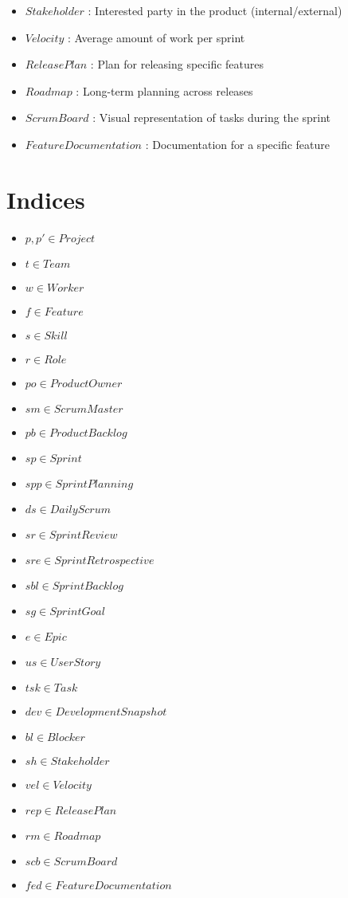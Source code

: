 \documentclass[11pt]{article}
\begin{document}
\begin{itemize}
    \item $Stakeholder$ : Interested party in the product (internal/external)
    \item $Velocity$ : Average amount of work per sprint
    \item $ReleasePlan$ : Plan for releasing specific features
    \item $Roadmap$ : Long-term planning across releases
    \item $ScrumBoard$ : Visual representation of tasks during the sprint
    \item $FeatureDocumentation$ : Documentation for a specific feature
\end{itemize}

\section{Indices}
\begin{itemize}
    \item $p, p' \in Project$
    \item $t \in Team$
    \item $w \in Worker$
    \item $f \in Feature$
    \item $s \in Skill$
    \item $r \in Role$
    \item $po \in ProductOwner$
    \item $sm \in ScrumMaster$
    \item $pb \in ProductBacklog$
    \item $sp \in Sprint$
    \item $spp \in SprintPlanning$
    \item $ds \in DailyScrum$
    \item $sr \in SprintReview$
    \item $sre \in SprintRetrospective$
    \item $sbl \in SprintBacklog$
    \item $sg \in SprintGoal$
    \item $e \in Epic$
    \item $us \in UserStory$
    \item $tsk \in Task$
    \item $dev \in DevelopmentSnapshot$
    \item $bl \in Blocker$
    \item $sh \in Stakeholder$
    \item $vel \in Velocity$
    \item $rep \in ReleasePlan$
    \item $rm \in Roadmap$
    \item $scb \in ScrumBoard$
    \item $fed \in FeatureDocumentation$
\end{itemize}
\end{document}
